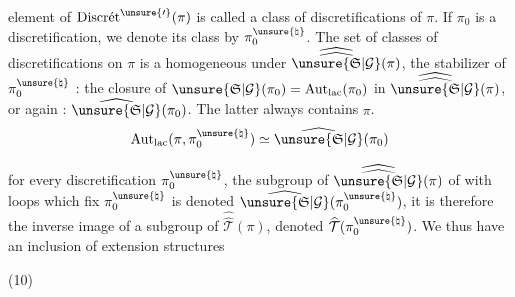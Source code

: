 
 element of $\operatorname{Discr\acute{e}t}^{\unsure{\prime}}(\pi)$ is called a
class of discretifications of $\pi$.
If $\pi_0$ is a discretification, we denote its class by
$\pi_0^{\unsure{\natural}}$. The set of classes of discretifications on $\pi$
is a homogeneous  under $\widehat{\widehat{\unsure{\mathfrak{S}|\mathcal{G}}}}(\pi)$, the stabilizer
of $\pi_0^{\unsure{\natural}}$  : the closure of
$\unsure{\mathfrak{S}|\mathcal{G}}(\pi_0)=\operatorname{Aut}_{\mathrm{lac}}(\pi_0)$ in
$\widehat{\widehat{\unsure{\mathfrak{S}|\mathcal{G}}}}(\pi)$, or again :
$\widehat{\unsure{\mathfrak{S}|\mathcal{G}}}(\pi_0)$.
The latter always contains $\pi$.
\[
\operatorname{Aut}_{\mathrm{lac}}(\pi,\pi_0^{\unsure{\natural}})
\simeq\widehat{\unsure{\mathfrak{S}|\mathcal{G}}}(\pi_0)
\]

 for every discretification $\pi_0^{\unsure{\natural}}$, the subgroup of
$\widehat{\widehat{\unsure{\mathfrak{S}|\mathcal{G}}}}(\pi)$ of  with loops which fix
$\pi_0^{\unsure{\natural}}$ is denoted $\widehat{\unsure{\mathfrak{S}|\mathcal{G}}}(\pi_0^{\unsure{\natural}})$,
it is therefore the inverse image of a subgroup of
$\widehat{\widehat{\mathcal{T}}}(\pi)$, denoted
$\widehat{\mathcal{T}}(\pi_0^{\unsure{\natural}})$. We thus have an inclusion of
extension structures

(10)


